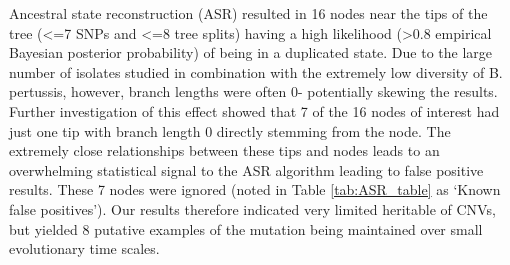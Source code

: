 \documentclass{article}
\begin{document}
\begin{table}[]
\caption{Table of ancestral reconstruction results}
\label{tab:ASR_table}
\end{table}

Ancestral state reconstruction (ASR) resulted in 16 nodes near the tips of the tree (<=7 SNPs and <=8 tree splits) having a high likelihood (>0.8 empirical Bayesian posterior probability) of being in a duplicated state. Due to the large number of isolates studied in combination with the extremely low diversity of B. pertussis, however, branch lengths were often 0- potentially skewing the results. Further investigation of this effect showed that 7 of the 16 nodes of interest had just one tip with branch length 0 directly stemming from the node. The extremely close relationships between these tips and nodes leads to an overwhelming statistical signal to the ASR algorithm leading to false positive results. These 7 nodes were ignored (noted in Table \ref{tab:ASR_table} as `Known false positives'). Our results therefore indicated very limited heritable of CNVs, but yielded 8 putative examples of the mutation being maintained over small evolutionary time scales.
\end{document}
